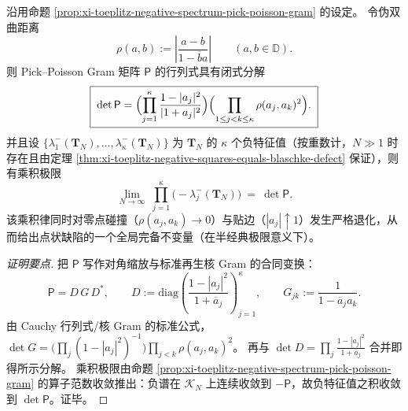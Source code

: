 \begin{proposition}\label{prop:xi-pick-poisson-det-factorization}
沿用命题 \ref{prop:xi-toeplitz-negative-spectrum-pick-poisson-gram} 的设定。
令伪双曲距离
\[
\rho(a,b):=\left|\frac{a-b}{1-\overline b a}\right|\qquad(a,b\in\mathbb{D}).
\]
则 Pick--Poisson Gram 矩阵 \(\mathsf P\) 的行列式具有闭式分解
\[
\boxed{\;
\det\mathsf P
=\Bigl(\prod_{j=1}^{\kappa}\frac{1-|a_j|^2}{|1+a_j|^2}\Bigr)
\Bigl(\prod_{1\le j<k\le\kappa}\rho(a_j,a_k)^2\Bigr).\;}
\]
并且设 \(\{\lambda_1^-(\mathbf{T}_N),\dots,\lambda_\kappa^-(\mathbf{T}_N)\}\) 为 \(\mathbf{T}_N\) 的 \(\kappa\) 个负特征值（按重数计，\(N\gg 1\) 时存在且由定理 \ref{thm:xi-toeplitz-negative-squares-equals-blaschke-defect} 保证），则有乘积极限
\[
\boxed{\;
\lim_{N\to\infty}\ \prod_{j=1}^{\kappa}\bigl(-\lambda_j^{-}(\mathbf{T}_N)\bigr)\ =\ \det\mathsf P. \;}
\]
该乘积律同时对零点碰撞（\(\rho(a_j,a_k)\to 0\)）与贴边（\(|a_j|\uparrow 1\)）发生严格退化，从而给出点状缺陷的一个全局完备不变量（在半经典极限意义下）。
\end{proposition}
\begin{proof}[证明要点]
把 \(\mathsf P\) 写作对角缩放与标准再生核 Gram 的合同变换：
\[
\mathsf P
=D\,G\,D^\ast,
\qquad
D:=\mathrm{diag}\!\left(\frac{1-|a_j|^2}{1+\overline a_j}\right)_{j=1}^{\kappa},
\qquad
G_{jk}:=\frac{1}{1-\overline a_j a_k}.
\]
由 Cauchy 行列式/核 Gram 的标准公式，\(\det G=\bigl(\prod_j(1-|a_j|^2)^{-1}\bigr)\prod_{j<k}\rho(a_j,a_k)^2\)。
再与 \(\det D=\prod_j\frac{1-|a_j|^2}{1+\overline a_j}\) 合并即得所示分解。
乘积极限由命题 \ref{prop:xi-toeplitz-negative-spectrum-pick-poisson-gram} 的算子范数收敛推出：负谱在 \(\mathcal K_N\) 上连续收敛到 \(-\mathsf P\)，故负特征值之积收敛到 \(\det\mathsf P\)。证毕。
\end{proof}



